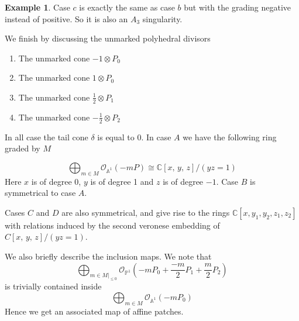 \documentclass[12pt,a4paper]{book}      %
\theoremstyle{definition}
\newtheorem{ex}[thm]{Example}
\newcommand{\mb}[1]{\mathbb{#1}}
\begin{document}
\begin{ex}
Case $c$ is exactly the same as case $b$ but with the grading negative instead of positive. So it is also an $A_3$ singularity.


We finish by discussing the unmarked polyhedral divisors

\begin{enumerate}[label =\Alph*)]
\item The unmarked cone $-1 \otimes P_0$
\item The unmarked cone $1 \otimes P_0$
\item The unmarked cone $\frac{1}{2} \otimes P_1$
\item The unmarked cone $-\frac{1}{2} \otimes P_2$
\end{enumerate}

In all case the tail cone $\delta$ is equal to 0. In case $A$ we have the following ring graded by $M$

\[
\bigoplus_{m \in M} \mathcal{O}_{\mathbb{A}^1}(-mP) \cong \mathbb{C}[x,\, y, \, z]/(yz = 1)
\]
Here $x$ is of degree 0, $y$ is of degree 1 and $z$ is of degree $-1$. Case $B$ is symmetrical to case $A$. 

Cases $C$ and $D$ are also symmetrical, and give rise to the rings $\mathbb{C}[x, y_1, y_2, z_1, z_2]$ with relations induced by the second veronese embedding of $C[x, \, y, \, z]/(yz = 1)$. 


We also briefly describe the inclusion maps. We note that
\[
\bigoplus_{m \in M|_{\leq 0}} \mathcal{O}_{\mathbb{P}^1} \left(-mP_0 +\frac{-m}{2} P_1 + \frac{m}{2}P_2 \right) 
\]
is trivially contained inside 
\[
\bigoplus_{m \in M} \mathcal{O}_{\mathbb{A}^1}(-mP_0)
\]
Hence we get an associated map of affine patches.
\end{ex}

\begin{comment}
We also provide a quick example of when a polyhedral divisor is unmarked but has unmarked subcones cones as the boundary. 


\begin{ex}\rm
Let $N$ be $\mb{Q}^2$. Consider the polyhedral divisor defined by $\delta \otimes P_0 + ((1, 1) + \delta) \otimes P_1$ over $\mathbb{P}^1$ where $\delta = \langle (1,0) , \, (0, 1) \rangle$. We now insist that two dimensional cone is marked. However if we pick a ray of the tail fan, and calculate the dual we see that this does not satisfy of being semiample on the boundary, if the base curve was non affine.

Upon calculation of the affine ring this can be seen as a toric downgrade of the Atiyah flop, with the quotient corresponding to one of the two natural maps to $\mathbb{P}^1$. To see the two flops the first is by unmarking the two dimensional cone and the other is given by the same polyhedral coefficients but now the tail cone is a tail fan with the ray $(1,1)$ bisecting it. This corresponds to only one of the resolutions resolving the quotient down to the $\mathbb{P}^1$.
\end{ex}
\end{comment}
\end{document}
